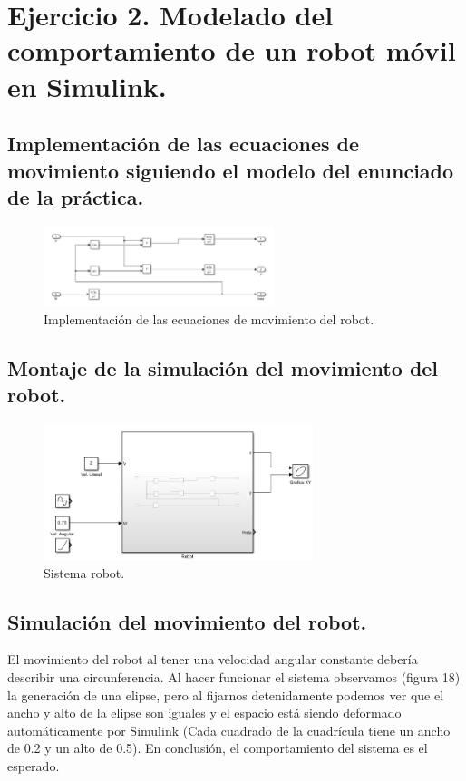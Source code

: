 \documentclass[a4paper, 12pt]{article}
\begin{document}
    \newpage
    
	\section{Ejercicio 2. Modelado del comportamiento de un robot móvil en Simulink.}
	
	\subsection{Implementación de las ecuaciones de movimiento siguiendo el modelo del enunciado de la práctica.}

    \begin{figure}[htp!]
	\centering
		\includegraphics[width=0.6\textwidth]{figures/Parte2Ej2p1.png}
		\caption{Implementación de las ecuaciones de movimiento del robot.}
	\end{figure}

    \subsection{Montaje de la simulación del movimiento del robot.}
        
    \begin{figure}[htp!]
	\centering
		\includegraphics[width=0.7\textwidth]{figures/Parte2Ej2p2f1.png}
		\caption{Sistema robot.}
	\end{figure}

    \subsection{Simulación del movimiento del robot.}
    
    El movimiento del robot al tener una velocidad angular constante debería describir una circunferencia. Al hacer funcionar el sistema observamos (figura 18) la generación de una elipse, pero al fijarnos detenidamente podemos ver que el ancho y alto de la elipse son iguales y el espacio está siendo deformado automáticamente por Simulink (Cada cuadrado de la cuadrícula tiene un ancho de 0.2 y un alto de 0.5). En conclusión, el comportamiento del sistema es el esperado.
        
\end{document}
